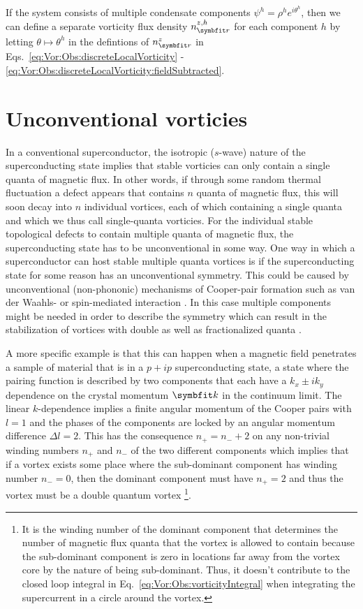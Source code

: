 If the system consists of multiple condensate components $\psi^h = \rho^he^{i\theta^h}$, then we can define a separate vorticity flux density $n^{z,h}_\v{r}$ for each component
$h$ by letting $\theta\mapsto\theta^h$ in the defintions of $n^z_\v{r}$ in Eqs.~\eqref{eq:Vor:Obs:discreteLocalVorticity} - \eqref{eq:Vor:Obs:discreteLocalVorticity:fieldSubtracted}.


\section{Unconventional vorticies}
\label{sec:Vor:UnconventionalVorticies}

In a conventional superconductor, the isotropic (\ie $s$-wave) nature of the superconducting state implies that stable vorticies can only contain a single quanta of magnetic flux.
In other words, if through some random thermal fluctuation a defect appears that contains $n$ quanta of magnetic flux, this will soon decay into $n$ individual vortices,
each of which containing a single quanta and which we thus call single-quanta vorticies.
For the individual stable topological defects to contain
multiple quanta of magnetic flux, the superconducting state has to be unconventional in some way.
One way in which a superconductor can host stable multiple quanta vortices is if the superconducting state for some reason has an unconventional symmetry. This could \eg be
caused by unconventional (\ie non-phononic) mechanisms of Cooper-pair formation such as van der Waahls- or spin-mediated interaction \cite{Sigrist05}.
In this case multiple components might be needed in order to describe the symmetry which can result in the stabilization of vortices with double as well as fractionalized
quanta \cite{Babaev02}.

A more specific example is that this can happen when a magnetic field penetrates a sample of material that is in a $p+ip$ superconducting state, \ie a state where the
pairing function is described by two components that each have a $k_x\pm ik_y$ dependence on the crystal momentum $\v{k}$ in the continuum limit. The linear
$k$-dependence implies a finite angular momentum of the Cooper pairs with $l=1$ and the phases of the components are locked by an angular momentum difference $\Delta l=2$.
This has the consequence $n_+ = n_- + 2$ on any non-trivial winding numbers $n_+$ and $n_-$ of the two different components which implies that if a vortex exists some
place where the sub-dominant component has winding number $n_-=0$, then the dominant component must have $n_+=2$ and thus the vortex must be a double quantum vortex%
\footnote{It is the winding number of the dominant component that determines the number of magnetic flux quanta that the vortex is allowed to contain because the sub-dominant
component is zero in locations far away from the vortex core by the nature of being sub-dominant. Thus, it doesn't contribute to the closed loop integral in 
Eq.~\eqref{eq:Vor:Obs:vorticityIntegral} when integrating the supercurrent in a circle around the vortex.}.


